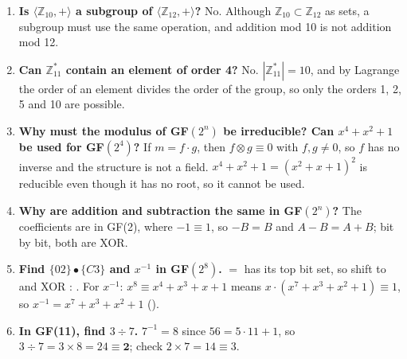 \begin{enumerate}[leftmargin=*]
  \item \textbf{Is $\langle \mathbb{Z}_{10}, + \rangle$ a subgroup of $\langle \mathbb{Z}_{12}, + \rangle$?} No. Although $\mathbb{Z}_{10} \subset \mathbb{Z}_{12}$ as sets, a subgroup must use the same operation, and addition mod 10 is not addition mod 12.
  \item \textbf{Can $\mathbb{Z}_{11}^*$ contain an element of order 4?} No. $|\mathbb{Z}_{11}^*| = 10$, and by Lagrange the order of an element divides the order of the group, so only the orders 1, 2, 5 and 10 are possible.
  \item \textbf{Why must the modulus of GF$(2^n)$ be irreducible? Can $x^4 + x^2 + 1$ be used for GF$(2^4)$?} If $m = f \cdot g$, then $f \otimes g \equiv 0$ with $f, g \ne 0$, so $f$ has no inverse and the structure is not a field. $x^4 + x^2 + 1 = (x^2 + x + 1)^2$ is reducible even though it has no root, so it cannot be used.
  \item \textbf{Why are addition and subtraction the same in GF$(2^n)$?} The coefficients are in GF(2), where $-1 \equiv 1$, so $-B = B$ and $A - B = A + B$; bit by bit, both are XOR.
  \item \textbf{Find $\{02\} \bullet \{C3\}$ and $x^{-1}$ in GF$(2^8)$.}  $=$  has its top bit set, so shift to  and XOR : \textbf{}. For $x^{-1}$: $x^8 \equiv x^4 + x^3 + x + 1$ means $x \cdot (x^7 + x^3 + x^2 + 1) \equiv 1$, so $x^{-1} = x^7 + x^3 + x^2 + 1$ ().
  \item \textbf{In GF(11), find $3 \div 7$.} $7^{-1} = 8$ since $56 = 5 \cdot 11 + 1$, so $3 \div 7 = 3 \times 8 = 24 \equiv \mathbf{2}$; check $2 \times 7 = 14 \equiv 3$.
\end{enumerate}
